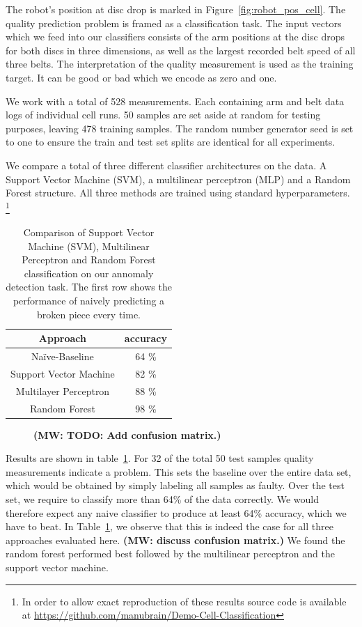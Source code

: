 \documentclass[5p,times,procedia]{elsarticle}
\newcommand{\MW}[1]{{\color{teal} {\bf (MW: #1)}}}
\begin{document}
The robot's position at disc drop is marked in 
Figure~\ref{fig:robot_pos_cell}. The quality prediction problem is 
framed as a classification task. The input vectors which we feed into our
classifiers consists of the arm positions at the disc drops for both
discs in three dimensions, as well as the largest recorded belt speed
of all three belts. The interpretation of the quality measurement is 
used as the training target. It can be good or bad which we encode as 
zero and one.

We work with a total of 528 measurements. Each containing arm and belt data
logs of individual cell runs. 50 samples are set aside at random for testing 
purposes, leaving 478 training samples. The random number generator seed is
set to one to ensure the train and test set splits are identical 
for all experiments.

We compare a total of three different classifier architectures on the data.
A Support Vector Machine (SVM), a multilinear perceptron (MLP) and a Random Forest
structure. All three methods are trained using standard hyperparameters.
\footnote{In order to allow exact reproduction of these results source
code is available at \url{https://github.com/manubrain/Demo-Cell-Classification}}
\begin{table}
       \centering
       \begin{tabular}{ c c } \toprule
              Approach         & accuracy \\ \midrule
              Na\"ive-Baseline & 64 \% \\
              Support Vector Machine & 82 \% \\
              Multilayer Perceptron & 88 \% \\
              Random Forest          & 98 \% \\ \bottomrule
       \end{tabular}
       \caption{Comparison of Support Vector Machine (SVM), Multilinear Perceptron and 
                Random Forest classification on our annomaly detection task. 
                The first row shows the performance of naively predicting a broken piece
                every time.}
       \label{tab:class_comp}
\end{table}

\begin{figure}
\caption{\MW{TODO: Add confusion matrix.}}
\end{figure}

Results are shown in table~\ref{tab:class_comp}. For 32 of the total 50 test samples
quality measurements indicate a problem. This sets the 
baseline over the entire data set, which would be obtained by simply labeling all samples
as faulty. Over the test set, we require to classify more than 64\% of the data correctly.
We would therefore expect any naive classifier to produce at least 64\% accuracy, which we have to beat. In Table~\ref{tab:class_comp}, we observe that this is indeed the case for all three approaches evaluated here.
\MW{discuss confusion matrix.}
We found the random forest performed best followed by the multilinear
perceptron and the support vector machine. 
\end{document}
